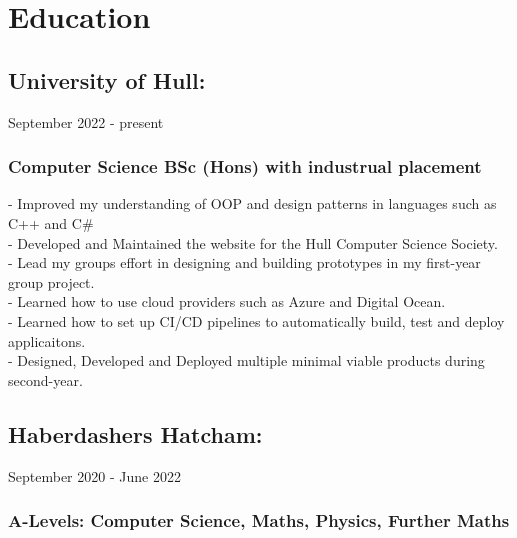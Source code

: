 \section{Education}

\subsection{University of Hull:} September 2022 - present \\

\subsubsection{Computer Science BSc (Hons) with industrual placement}

-\: Improved my understanding of OOP and design patterns in languages such as C++ and C\#\\
-\: Developed and Maintained the website for the Hull Computer Science Society. \\
-\: Lead my groups effort in designing and building prototypes in my first-year group project. \\ 
-\: Learned how to use cloud providers such as Azure and Digital Ocean. \\
-\: Learned how to set up CI/CD pipelines to automatically build, test and deploy applicaitons. \\
-\: Designed, Developed and Deployed multiple minimal viable products during second-year. 

\vspace{10pt}
\subsection{Haberdashers Hatcham:} September 2020 - June 2022 \\ 

\subsubsection{A-Levels: Computer Science, Maths, Physics, Further Maths}
